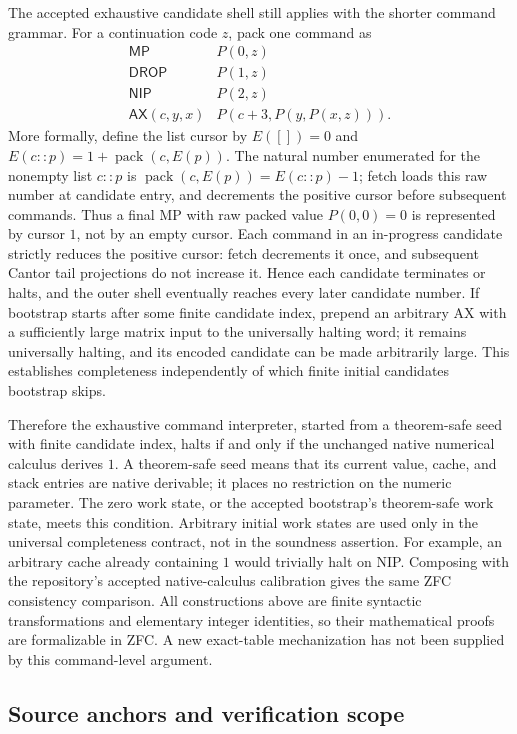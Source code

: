The accepted exhaustive candidate shell still applies with the shorter
command grammar.  For a continuation code $z$, pack one command as
\[
 \begin{array}{c|c}
 \mathsf{MP}&P(0,z)\\
 \mathsf{DROP}&P(1,z)\\
 \mathsf{NIP}&P(2,z)\\
 \mathsf{AX}(c,y,x)&P(c+3,P(y,P(x,z))).
 \end{array}
\]
More formally, define the list cursor by $E([])=0$ and
$E(c::p)=1+\operatorname{pack}(c,E(p))$.  The natural number enumerated
for the nonempty list $c::p$ is $\operatorname{pack}(c,E(p))=E(c::p)-1$;
fetch loads this raw number at candidate entry, and decrements the positive
cursor before subsequent commands.  Thus a final MP with raw packed value
$P(0,0)=0$ is represented by cursor $1$, not by an empty cursor.  Each
command in an in-progress candidate strictly reduces
the positive cursor: fetch decrements it once, and subsequent Cantor tail
projections do not increase it.  Hence each candidate terminates or halts,
and the outer shell eventually reaches every later candidate number.
If bootstrap starts after some finite candidate index, prepend an arbitrary
AX with a sufficiently large matrix input to the universally halting word;
it remains universally halting, and its encoded candidate can be made
arbitrarily large.  This establishes completeness independently of which
finite initial candidates bootstrap skips.

Therefore the exhaustive command interpreter, started from a theorem-safe
seed with finite candidate index, halts if and only if the unchanged
native numerical calculus derives $1$.  A theorem-safe seed means that
its current value, cache, and stack entries are native derivable; it places
no restriction on the numeric parameter.  The zero work state, or the
accepted bootstrap's theorem-safe work state, meets this condition.
Arbitrary initial work states are used only in the universal completeness
contract, not in the soundness assertion.  For example, an arbitrary cache
already containing $1$ would trivially halt on NIP.
Composing with the repository's
accepted native-calculus calibration gives the same ZFC consistency
comparison.  All constructions above are finite syntactic transformations
and elementary integer identities, so their mathematical proofs are
formalizable in ZFC.  A new exact-table mechanization has not been supplied
by this command-level argument.

\subsection{Source anchors and verification scope}

